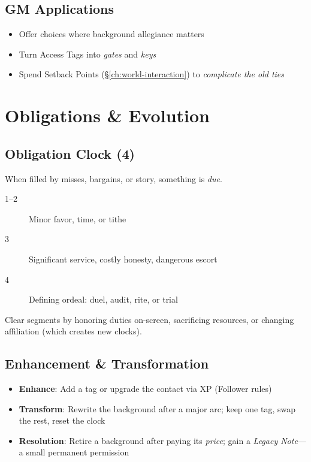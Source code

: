 \begin{multicols}{2}
\subsection*{GM Applications}
\begin{itemize}
\item Offer choices where background allegiance matters
\item Turn Access Tags into \emph{gates} and \emph{keys}
\item Spend Setback Points (\S\ref{ch:world-interaction}) to \emph{complicate the old ties}
\end{itemize}

\section{Obligations \& Evolution}
\label{sec:bg-obligation}

\subsection*{Obligation Clock (4)}
When filled by misses, bargains, or story, something is \emph{due}.
\begin{description}
\item[1--2] Minor favor, time, or tithe
\item[3] Significant service, costly honesty, dangerous escort
\item[4] Defining ordeal: duel, audit, rite, or trial
\end{description}
Clear segments by honoring duties on-screen, sacrificing resources, or changing affiliation (which creates new clocks).

\subsection*{Enhancement \& Transformation}
\begin{itemize}
\item \textbf{Enhance}: Add a tag or upgrade the contact via XP (Follower rules)
\item \textbf{Transform}: Rewrite the background after a major arc; keep one tag, swap the rest, reset the clock
\item \textbf{Resolution}: Retire a background after paying its \emph{price}; gain a \emph{Legacy Note}—a small permanent permission
\end{itemize}


\end{multicols}
